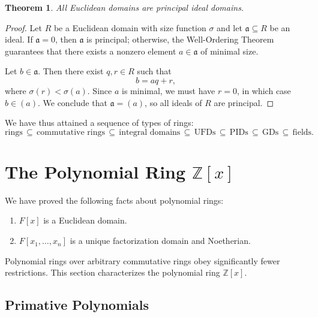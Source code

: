 \documentclass[11pt]{article}
\newtheorem{theorem}{Theorem}
\begin{document}
\begin{adjustwidth}{0.5cm}{}
  \begin{theorem}
    All Euclidean domains are principal ideal domains.
  \end{theorem}
  \begin{proof}
    Let $R$ be a Euclidean domain with size function $\sigma$ and let $\mathfrak{a} \subseteq R$ be an ideal. If $\mathfrak{a} = 0$, then $\mathfrak{a}$ is principal; otherwise, the Well-Ordering Theorem guarantees that there exists a nonzero element $a \in \mathfrak{a}$ of minimal size.

    Let $b \in \mathfrak{a}$. Then there exist $q, r \in R$ such that
    \[
      b = aq + r,
    \]
    where $\sigma(r) < \sigma(a)$. Since $a$ is minimal, we must have $r = 0$, in which case $b \in (a)$. We conclude that $\mathfrak{a} = (a)$, so all ideals of $R$ are principal.
  \end{proof}
\end{adjustwidth}

We have thus attained a sequence of types of rings:
\[
  \text{rings} \, \subseteq \, \text{commutative rings} \, \subseteq \, \text{integral domains} \, \subseteq \, \text{UFDs} \, \subseteq \, \text{PIDs} \, \subseteq \, \text{GDs} \, \subseteq \, \text{fields}.
\]


\section{The Polynomial Ring \texorpdfstring{$\mathbb{Z}[x]$}{Z[x]}}

We have proved the following facts about polynomial rings:
\begin{enumerate}
  \item $F[x]$ is a Euclidean domain.
  \item $F[x_{1}, \ldots, x_{n}]$ is a unique factorization domain and Noetherian.
\end{enumerate}
Polynomial rings over arbitrary commutative rings obey significantly fewer restrictions. This section characterizes the polynomial ring $\mathbb{Z}[x]$.


\subsection{Primative Polynomials}

\end{document}
